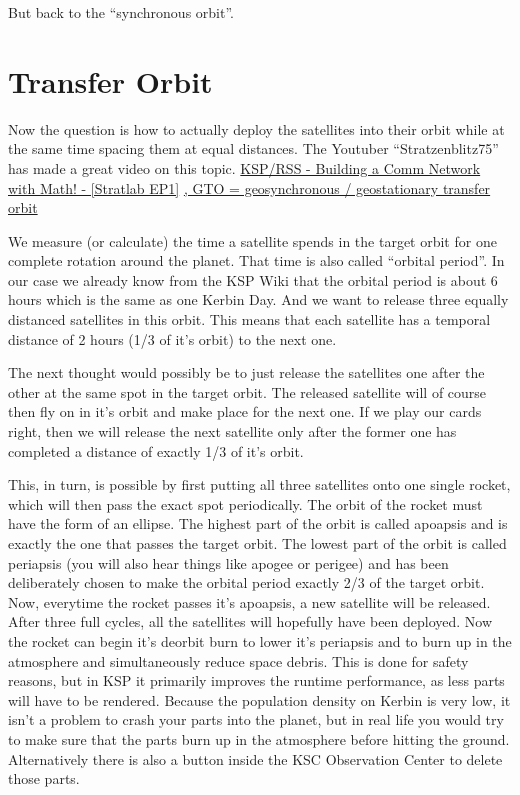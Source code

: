 \documentclass[12pt,paper=A4,numbers=noenddot,bibliography=totoc,listof=totoc,DIV=11,BCOR=1mm]{scrreprt}
\begin{document}
\medskip But back to the ``synchronous orbit''.

\section{Transfer Orbit}
Now the question is how to actually deploy the satellites into their orbit while at the same time spacing them at equal distances.
The Youtuber ``Stratzenblitz75'' has made a great video on this topic.
\href{https://youtu.be/3Qb_gcJyGQI}{KSP/RSS - Building a Comm Network with Math! - [Stratlab EP1]} \href{https://en.wikipedia.org/wiki/Geostationary_transfer_orbit}{, GTO = geosynchronous / geostationary transfer orbit}

We measure (or calculate) the time a satellite spends in the target orbit for one complete rotation around the planet. That time is also called ``orbital period''. In our case we already know from the KSP Wiki that the orbital period is about 6 hours which is the same as one Kerbin Day.
And we want to release three equally distanced satellites in this orbit. This means that each satellite has a temporal distance of 2 hours (1/3 of it's orbit) to the next one.

The next thought would possibly be to just release the satellites one after the other at the same spot in the target orbit. The released satellite will of course then fly on in it's orbit and make place for the next one. If we play our cards right, then we will release the next satellite only after the former one has completed a distance of exactly 1/3 of it's orbit.

This, in turn, is possible by first putting all three satellites onto one single rocket, which will then pass the exact spot periodically.
The orbit of the rocket must have the form of an ellipse. The highest part of the orbit is called apoapsis and is exactly the one that passes the target orbit. The lowest part of the orbit is called periapsis (you will also hear things like apogee or perigee) and has been deliberately chosen to make the orbital period exactly 2/3 of the target orbit.
Now, everytime the rocket passes it's apoapsis, a new satellite will be released.
After three full cycles, all the satellites will hopefully have been deployed. Now the rocket can begin it's deorbit burn to lower it's periapsis and to burn up in the atmosphere and simultaneously reduce space debris. This is done for safety reasons, but in KSP it primarily improves the runtime performance, as less parts will have to be rendered. Because the population density on Kerbin is very low, it isn't a problem to crash your parts into the planet, but in real life you would try to make sure that the parts burn up in the atmosphere before hitting the ground.
Alternatively there is also a button inside the KSC Observation Center to delete those parts.
\end{document}
